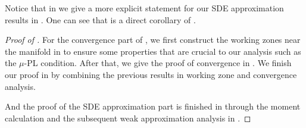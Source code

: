 
Notice that in  we give a more explicit statement for our SDE approximation results in . One can see that  is a direct corollary of .

\begin{proof}[Proof of ]
    For the convergence part of , we first construct the working zones near the manifold in  to ensure some properties that are crucial to our analysis such as the $\mu$-PL condition. After that, we give the proof of convergence in . We finish our proof in  by combining the previous results in working zone and convergence analysis.
    
    And the proof of the SDE approximation part is finished in  through the moment calculation and the subsequent weak approximation analysis in .
\end{proof}

